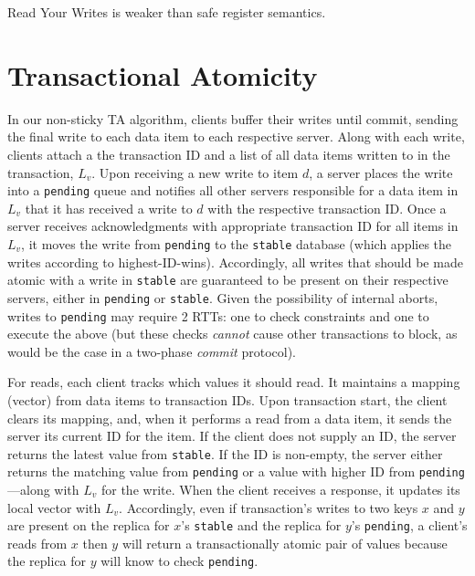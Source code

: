 \begin{observation}
Read Your Writes is weaker than safe register semantics.
\end{observation}

\section{Transactional Atomicity}

In our non-sticky TA algorithm, clients buffer their writes until
commit, sending the final write to each data item to each respective
server. Along with each write, clients attach a the transaction ID and
a list of all data items written to in the transaction, $L_v$. Upon
receiving a new write to item $d$, a server places the write into a
\texttt{pending} queue and notifies all other servers responsible for
a data item in $L_v$ that it has received a write to $d$ with the
respective transaction ID. Once a server receives acknowledgments with
appropriate transaction ID for all items in $L_v$, it moves the write
from \texttt{pending} to the \texttt{stable} database (which applies
the writes according to highest-ID-wins). Accordingly, all writes that
should be made atomic with a write in \texttt{stable} are guaranteed
to be present on their respective servers, either in \texttt{pending}
or \texttt{stable}. Given the possibility of internal aborts, writes
to \texttt{pending} may require 2 RTTs: one to check constraints and
one to execute the above (but these checks \textit{cannot} cause other
transactions to block, as would be the case in a two-phase
\textit{commit} protocol).

For reads, each client tracks which values it should read. It
maintains a mapping (vector) from data items to transaction IDs. Upon
transaction start, the client clears its mapping, and, when it
performs a read from a data item, it sends the server its current ID
for the item. If the client does not supply an ID, the server returns
the latest value from \texttt{stable}. If the ID is non-empty, the
server either returns the matching value from \texttt{pending} or a
value with higher ID from \texttt{pending}---along with $L_v$ for the
write. When the client receives a response, it updates its local
vector with $L_v$. Accordingly, even if transaction's writes to two
keys $x$ and $y$ are present on the replica for $x$'s \texttt{stable}
and the replica for $y$'s \texttt{pending}, a client's reads from $x$
then $y$ will return a transactionally atomic pair of values because
the replica for $y$ will know to check \texttt{pending}.
